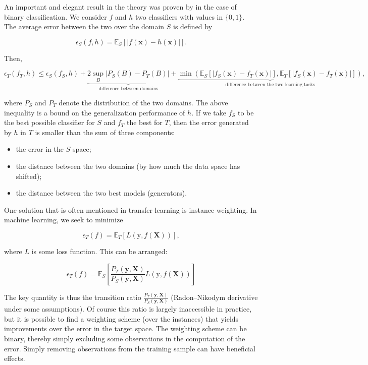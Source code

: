 An important and elegant result in the theory was proven by \cite{ben2010theory} in the case of binary classification. We consider $f$ and $h$ two classifiers with values in $\{0,1 \}$. The average error between the two over the domain $S$ is defined by

\begin{equation}
\epsilon_S(f,h)=\mathbb{E}_S[|f(\textbf{x})-h(\textbf{x})|].
\end{equation}

Then,

\begin{equation}
\epsilon_T(f_T,h)\le \epsilon_S(f_S,h)+\underbrace{2 \sup_B|P_S(B)-P_T(B)|}_{\text{ difference between domains }} + \underbrace{ \min\left(\mathbb{E}_S[|f_S(\textbf{x})-f_T(\textbf{x})|],\mathbb{E}_T[|f_S(\textbf{x})-f_T(\textbf{x})|]\right)}_{\text{difference between the two learning tasks}},
\end{equation}

where $P_S$ and $P_T$ denote the distribution of the two domains. The above inequality is a bound on the generalization performance of $h$. If we take $f_S$ to be the best possible classifier for $S$ and $f_T$ the best for $T$, then the error generated by $h$ in $T$ is smaller than the sum of three components:

\begin{itemize}
\item the error in the $S$ space;
\item the distance between the two domains (by how much the data space has shifted);
\item the distance between the two best models (generators).
\end{itemize}

One solution that is often mentioned in transfer learning is instance weighting. In machine learning, we seek to minimize

\begin{equation}
\epsilon_T(f)=\mathbb{E}_T\left[L(\text{y},f(\textbf{X})) \right],
\end{equation}

where $L$ is some loss function. This can be arranged:

\begin{equation}
\epsilon_T(f)=\mathbb{E}_S \left[\frac{P_T(\textbf{y},\textbf{X})}{P_S(\textbf{y},\textbf{X})} L(\text{y},f(\textbf{X})) \right]
\end{equation}

The key quantity is thus the transition ratio $\frac{P_T(\textbf{y},\textbf{X})}{P_S(\textbf{y},\textbf{X})}$ (Radon--Nikodym derivative under some assumptions). Of course this ratio is largely inaccessible in practice, but it is possible to find a weighting scheme (over the instances) that yields improvements over the error in the target space. The weighting scheme can be binary, thereby simply excluding some observations in the computation of the error. Simply removing observations from the training sample can have beneficial effects.

